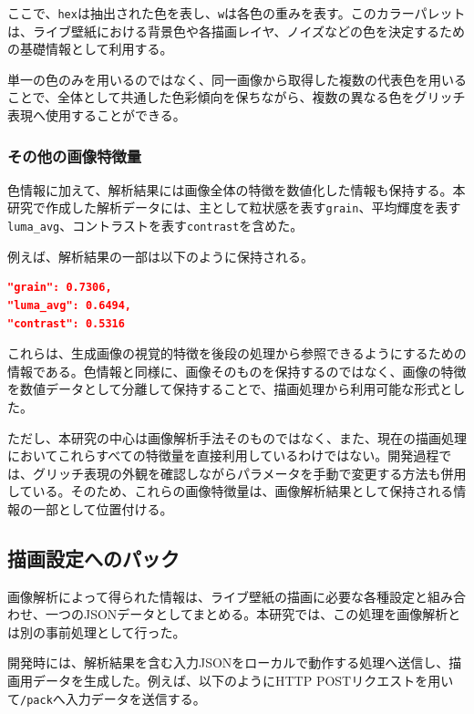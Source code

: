 ここで、\texttt{hex}は抽出された色を表し、\texttt{w}は各色の重みを表す。このカラーパレットは、ライブ壁紙における背景色や各描画レイヤ、ノイズなどの色を決定するための基礎情報として利用する。

単一の色のみを用いるのではなく、同一画像から取得した複数の代表色を用いることで、全体として共通した色彩傾向を保ちながら、複数の異なる色をグリッチ表現へ使用することができる。


\subsubsection{その他の画像特徴量}

色情報に加えて、解析結果には画像全体の特徴を数値化した情報も保持する。本研究で作成した解析データには、主として粒状感を表す\texttt{grain}、平均輝度を表す\texttt{luma\_avg}、コントラストを表す\texttt{contrast}を含めた。

例えば、解析結果の一部は以下のように保持される。

\noindent\begin{minipage}{\linewidth}
\begin{lstlisting}[language=JSON,caption={画像特徴量の例},label={lst:image-features}]
"grain": 0.7306,
"luma_avg": 0.6494,
"contrast": 0.5316
\end{lstlisting}
\end{minipage}\par

これらは、生成画像の視覚的特徴を後段の処理から参照できるようにするための情報である。色情報と同様に、画像そのものを保持するのではなく、画像の特徴を数値データとして分離して保持することで、描画処理から利用可能な形式とした。

ただし、本研究の中心は画像解析手法そのものではなく、また、現在の描画処理においてこれらすべての特徴量を直接利用しているわけではない。開発過程では、グリッチ表現の外観を確認しながらパラメータを手動で変更する方法も併用している。そのため、これらの画像特徴量は、画像解析結果として保持される情報の一部として位置付ける。


\subsection{描画設定へのパック}

画像解析によって得られた情報は、ライブ壁紙の描画に必要な各種設定と組み合わせ、一つのJSONデータとしてまとめる。本研究では、この処理を画像解析とは別の事前処理として行った。

開発時には、解析結果を含む入力JSONをローカルで動作する処理へ送信し、描画用データを生成した。例えば、以下のようにHTTP POSTリクエストを用いて\texttt{/pack}へ入力データを送信する。

